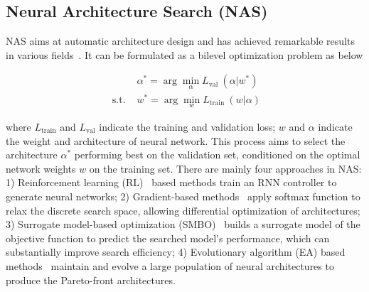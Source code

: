 \documentclass[runningheads]{llncs}
\begin{document}
\subsection{Neural Architecture Search (NAS)}






NAS aims at automatic architecture design and has achieved remarkable results in various fields~\cite{nas_survey,automl_he}. It can be formulated as a bilevel optimization problem as below

\begin{equation}
\begin{array}{ll} 
& \alpha^{*}=\arg \min _{\alpha} L_{\text {val }}\left(\alpha | w^{*}\right) \\
\text { s.t. } & w^{*}=\arg \min _{w} L_{\text {train }}(w | \alpha)
\end{array}
\end{equation}

\noindent where $L_{\text {train}}$ and $L_{\text {val}}$ indicate the training and validation loss; $w$ and $\alpha$ indicate the weight and architecture of neural network. This process aims to select the architecture $\alpha^*$ performing best on the validation set, conditioned on the optimal network weights $w$ on the training set. There are mainly four approaches in NAS: 1) Reinforcement learning (RL)~\cite{nas2016,enas} based methods train an RNN controller to generate neural networks; 2) Gradient-based methods~\cite{darts} apply softmax function to relax the discrete search space, allowing differential optimization of architectures; 3) Surrogate model-based optimization (SMBO)~\cite{pnas_liu18} builds a surrogate model of the objective function to predict the searched model's performance, which can substantially improve search efficiency; 4) Evolutionary algorithm (EA) based methods~\cite{amoebanet,cars} maintain and evolve a large population of neural architectures to produce the Pareto-front architectures.
\end{document}
